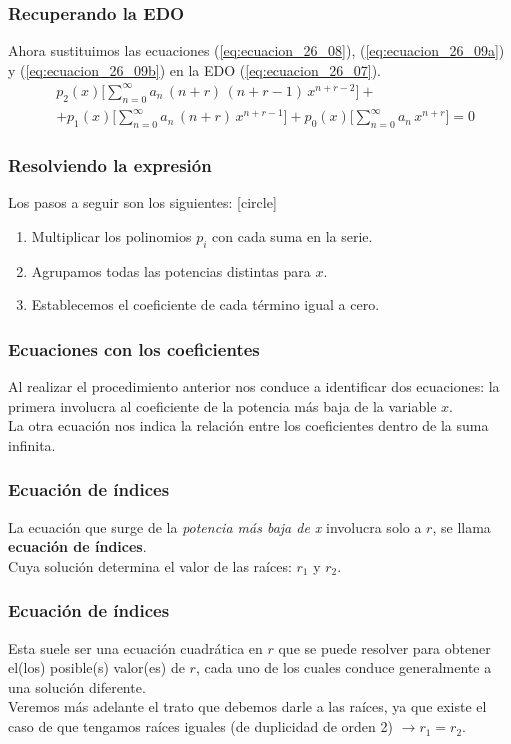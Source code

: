 \documentclass[12pt]{beamer}
\begin{document}
\begin{frame}
\frametitle{Recuperando la EDO}
Ahora sustituimos las ecuaciones (\ref{eq:ecuacion_26_08}), (\ref{eq:ecuacion_26_09a}) y (\ref{eq:ecuacion_26_09b}) en la EDO (\ref{eq:ecuacion_26_07}).
\pause
\begin{align*}
&p_{2}(x) \bigg[ \sum_{n=0}^{\infty} a_{n} \, (n + r) \, (n + r - 1) \, x^{n+r-2} \bigg] + \\[1em]
&+ p_{1} (x) \bigg[ \sum_{n=0}^{\infty} a_{n} \, (n + r) \, x^{n+r-1} \bigg] + p_{0}(x) \bigg[ \sum_{n=0}^{\infty} a_{n} \, x^{n+r} \bigg] = 0
\end{align*}
\end{frame}
\begin{frame}
\frametitle{Resolviendo la expresión}
Los pasos a seguir son los siguientes:
[circle]
\begin{enumerate}[<+->]
\item Multiplicar los polinomios $p_{i}$ con cada suma en la serie.
\item Agrupamos todas las potencias distintas para $x$.
\item Establecemos el coeficiente de cada término igual a cero.
\end{enumerate}
\end{frame}
\begin{frame}
\frametitle{Ecuaciones con los coeficientes}
Al realizar el procedimiento anterior nos conduce a identificar dos ecuaciones: la primera involucra al  coeficiente de la potencia más baja de la variable $x$.
\\
\bigskip
\pause
La otra ecuación nos indica la relación entre los coeficientes dentro de la suma infinita.
\end{frame}
\begin{frame}
\frametitle{Ecuación de índices}
La ecuación que surge de la \emph{potencia más baja de x} involucra solo a $r$, se llama \textbf{ecuación de índices}.
\\
\bigskip
\pause
Cuya solución determina el valor de las raíces: $r_{1}$ y $r_{2}$.
\end{frame}
\begin{frame}
\frametitle{Ecuación de índices}
Esta suele ser una ecuación cuadrática en $r$ que se puede resolver para obtener el(los) posible(s) valor(es) de $r$, cada uno de los cuales conduce generalmente a una solución diferente.
\\
\bigskip
\pause
Veremos más adelante el trato que debemos darle a las raíces, ya que existe el caso de que tengamos raíces iguales (de duplicidad de orden 2) $\to r_{1} = r_{2}$.
\end{frame}
\end{document}

